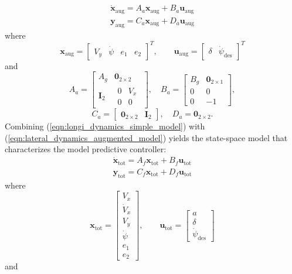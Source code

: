 \documentclass[conference, 11pt]{IEEEtran}
\begin{document}
\begin{equation}
\label{eqn:lateral_dynamics_augmented_model}
\begin{array}{ll}
\dot{\textbf{x}}_{\text{aug}} =A_a \textbf{x}_{\text{aug}}+ B_a \textbf{u}_{\text{aug}}\\
\textbf{y}_{\text{aug}} =C_a \textbf{x}_{\text{aug}} + D_a \textbf{u}_{\text{aug}}
\end{array}
\end{equation}
where
\begin{equation*}
\textbf{x}_{\text{aug}} = \begin{bmatrix}
V_y&\dot{\psi}&e_1&e_2
\end{bmatrix}^T,
\qquad
\textbf{u}_{\text{aug}} = 
\begin{bmatrix}
\delta&\dot{\psi}_{\text{des}}
\end{bmatrix}^T
\end{equation*}
and
\[ 
A_a=\begin{bmatrix}
A_g&\textbf{0}_{2\times2}\\
\textbf{I}_2&\begin{matrix}
0&V_x\\
0&0
\end{matrix}
\end{bmatrix},
\quad
B_a=\begin{bmatrix}
B_g&\textbf{0}_{2\times1}\\
0&0\\
0&-1
\end{bmatrix},
\]
\[
C_a=\begin{bmatrix}
\textbf{0}_{2\times2}&\textbf{I}_2
\end{bmatrix}, 
\quad
D_a=
\textbf{0}_{2\times2}. 
\]
Combining (\ref{eqn:longi_dynamics_simple_model}) with (\ref{eqn:lateral_dynamics_augmented_model}) yields the state-space model that characterizes the model predictive controller:
\begin{equation}
\label{eqn:full_dynamics_model}
\begin{array}{ll}
\dot{\textbf{x}}_{\text{tot}} =A_f \textbf{x}_{\text{tot}}+ B_f \textbf{u}_{\text{tot}}\\
\textbf{y}_{\text{tot}} =C_f \textbf{x}_{\text{tot}} + D_f \textbf{u}_{\text{tot}}
\end{array}
\end{equation}
where
\begin{equation*}
\textbf{x}_{\text{tot}} = \begin{bmatrix}
V_x\\\dot{V}_x\\V_y\\\dot{\psi}\\e_1\\e_2
\end{bmatrix},
\qquad
\textbf{u}_{\text{tot}} = 
\begin{bmatrix}
a\\\delta\\\dot{\psi}_{\text{des}}
\end{bmatrix}
\end{equation*}
and
\end{document}
